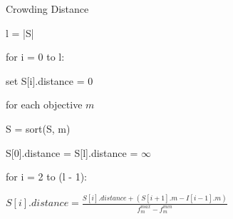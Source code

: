 \begin{algorithm*}\caption{Crowding Distance}
    l = |S|

    for i = 0 to l:

    \quad set S[i].distance = 0

    for each objective $m$

    \quad S = sort(S, m)

    \quad S[0].distance = S[l].distance = $\infty$

    \quad for i = 2 to (l - 1):

    \qquad 
    \begin{math}
        S[i].distance  = \frac{S[i].distance + (S[i + 1].m - I[i - 1].m)}{f^{max}_{m} - f^{min}_m}
    \end{math}
\end{algorithm*}


